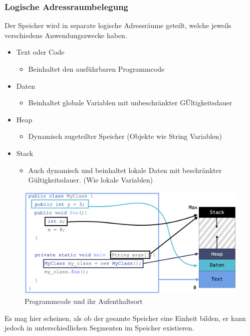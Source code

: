 \documentclass{article}
\begin{document}
	\subsubsection{Logische Adressraumbelegung}
	Der Speicher wird in separate logische Adressräume geteilt, welche jeweils verschiedene Anwendungszwecke haben.
	\begin{itemize}
		\item{Text oder Code}
		\begin{itemize}
			\item{Beinhaltet den ausführbaren Programmcode}
		\end{itemize}
		\item{Daten}
		\begin{itemize}
			\item{Beinhaltet globale Variablen mit unbeschränkter GÜltigkeitsdauer}
		\end{itemize}
		\item{Heap}
		\begin{itemize}
			\item{Dynamisch zugeteilter Speicher (Objekte wie String Variablen)}
		\end{itemize}
		\item{Stack}
		\begin{itemize}
			\item{Auch dynamisch und beinhaltet lokale Daten mit beschränkter Gültigkeitsdauer. (Wie lokale Variablen)}
		\end{itemize}
	\end{itemize}
	\begin{figure}[H]
	\centering
	\includegraphics[scale=0.3]{Bilder/virtual.png}
	\caption{Programmcode und ihr Aufenthaltsort}
	\end{figure}
	Es mag hier scheinen, als ob der gesamte Speicher eine Einheit bilden, er kann jedoch in unterschiedlichen Segmenten im Speicher existieren.
\end{document}
